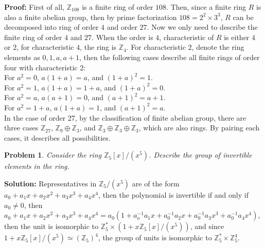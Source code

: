 \documentclass[12pt]{article}
\newtheorem{problem}{Problem}
\begin{document}
\textbf{Proof:} First of all, $\mathbb{Z}_{108}$ is a finite ring of order $108$. Then, since a finite ring $R$ is also a finite abelian group, then by prime factorization $108=2^2\times 3^3$, $R$ can be decomposed into ring of order $4$ and order $27$. Now we only need to describe the finite ring of order $4$ and $27$. When the order is $4$, characteristic of $R$ is either $4$ or $2$, for characteristic $4$, the ring is $\mathbb{Z}_4$. For characteristic $2$, denote the ring elements as $0, 1, a, a+1$, then the following cases describe all finite rings of order four with characteristic $2$: \\
\indent For $a^2=0$, $a(1+a)=a$, and $(1+a)^2=1$. \\
\indent For $a^2=1$, $a(1+a)=1+a$, and $(1+a)^2=0$. \\
\indent For $a^2=a$, $a(a+1)=0$, and $(a+1)^2=a+1$. \\
\indent For $a^2=1+a$, $a(1+a)=1$, and $(a+1)^2=a$. \\
In the case of order 27, by the classification of finite abelian group, there are three cases $\mathbb{Z}_{27}$, $\mathbb{Z}_{9}\oplus \mathbb{Z}_{3}$, and $\mathbb{Z}_{3}\oplus\mathbb{Z}_{3}\oplus\mathbb{Z}_{3}$,  which are also rings. By pairing each cases, it describes all possibilities.
\begin{problem}
Consider the ring $\mathbb{Z}_{5}[x]/(x^5)$. Describe the group of invertible elements in the ring.
\end{problem}

\textbf{Solution:} Representatives in $\mathbb{Z}_{5}/(x^5)$ are of the form $a_{0}+a_1x+a_2x^2+a_3x^3+a_4x^4$, then the polynomial is invertible if and only if $a_{0}\neq 0$, then $a_{0}+a_1x+a_2x^2+a_3x^3+a_4x^4=a_0(1+a_o^{-1}a_1x+a_0^{-1}a_2x+a_{0}^{-1}a_3x^3+a_0^{-1}a_4x^4)$, then the unit is isomorphic to $\mathbb{Z}_{5}^{*}\times (1+x\mathbb{Z}_{5}[x]/(x^5))$, and since $1+x\mathbb{Z}_{5}[x]/(x^5)\simeq (\mathbb{Z}_{5})^4$, the group of units is isomorphic to $\mathbb{Z}_{5}^{*}\times \mathbb{Z}_{5}^4$. 
\end{document}
